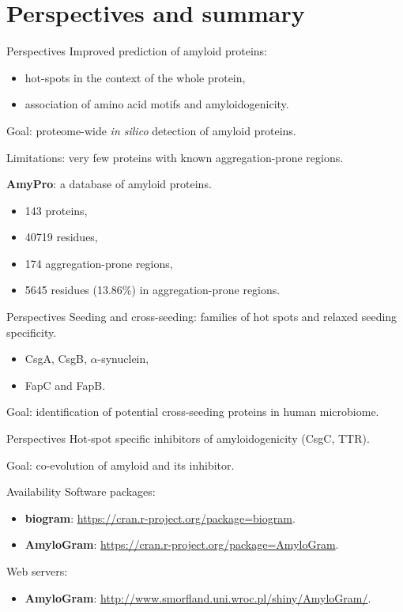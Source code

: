 \documentclass{beamer}\usepackage[]{graphicx}\usepackage[]{color}
\begin{document}
\section{Perspectives and summary}

\begin{frame}{Perspectives}
Improved prediction of amyloid proteins:
\begin{itemize}
\item hot-spots in the context of the whole protein,
\item association of amino acid motifs and amyloidogenicity.
\end{itemize}

Goal: proteome-wide \textit{in silico} detection of amyloid proteins.

Limitations: very few proteins with known aggregation-prone regions.

\textbf{AmyPro}: a database of amyloid proteins.

\begin{itemize}
 \item 143 proteins,
 \item 40719 residues,
 \item 174 aggregation-prone regions,
 \item 5645 residues (13.86\%) in aggregation-prone regions.
\end{itemize}

\end{frame}  


\begin{frame}{Perspectives}
Seeding and cross-seeding: families of hot spots and relaxed seeding specificity.
\begin{itemize}
\item CsgA, CsgB, $\alpha$-synuclein,
\item FapC and FapB.
\end{itemize}

Goal: identification of potential cross-seeding proteins in human microbiome.
\end{frame}  

\begin{frame}{Perspectives}
Hot-spot specific inhibitors of amyloidogenicity (CsgC, TTR).

Goal: co-evolution of amyloid and its inhibitor.
\end{frame}  

\begin{frame}{Availability}
Software packages:
\begin{itemize}
\item \textbf{biogram}: \url{https://cran.r-project.org/package=biogram}.
\item \textbf{AmyloGram}: \url{https://cran.r-project.org/package=AmyloGram}.
\end{itemize}

Web servers:
\begin{itemize}
\item \textbf{AmyloGram}: \url{http://www.smorfland.uni.wroc.pl/shiny/AmyloGram/}.
\end{itemize}
\end{frame}  
\end{document}
